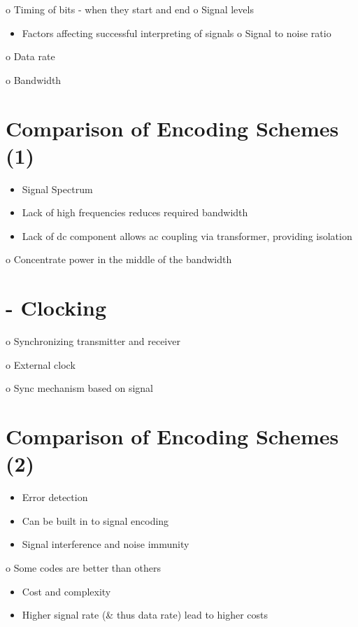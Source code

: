 \documentclass[10pt]{article}
\begin{document}
o Timing of bits - when they start and end o Signal levels

\begin{itemize}
  \item Factors affecting successful interpreting of signals o Signal to noise ratio
\end{itemize}

o Data rate

o Bandwidth

\section{Comparison of Encoding Schemes (1)}
\begin{itemize}
  \item Signal Spectrum

  \item Lack of high frequencies reduces required bandwidth

  \item Lack of dc component allows ac coupling via transformer, providing isolation

\end{itemize}

o Concentrate power in the middle of the bandwidth

\section{- Clocking}
o Synchronizing transmitter and receiver

o External clock

o Sync mechanism based on signal

\section{Comparison of Encoding Schemes (2)}
\begin{itemize}
  \item Error detection

  \item Can be built in to signal encoding

  \item Signal interference and noise immunity

\end{itemize}

o Some codes are better than others

\begin{itemize}
  \item Cost and complexity

  \item Higher signal rate (\& thus data rate) lead to higher costs

\end{itemize}
\end{document}
